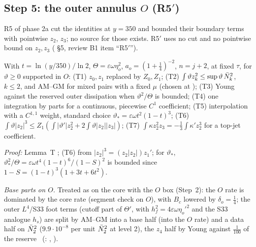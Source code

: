 \documentclass[11pt]{article}
\begin{document}
\subsection{Step 5: the outer annulus $O$ (R5$'$)}\label{A:sec:outer}
R5 of phase 2a cut the identities at $y=350$ and bounded their boundary terms with pointwise $z_2$, $z_3$; no source for those exists. R5$'$ uses no cut and no pointwise bound on $z_2,z_3$ ( \S5, review B1 item ``R5$'$'').
\begin{lemma}\label{A:lem:tools}
With $t=\ln(y/350)/\ln2$, $\Theta=\varepsilon\omega\eta_o^2$, $a_o=(1+\frac14)^{-2}$, $n=j+2$, at fixed $\tau$, for $\vartheta\ge0$ supported in $O$: (T1) $z_0,z_1$ replaced by $Z_0,Z_1$; (T2) $\int\vartheta z_k^2\le\sup\vartheta\,\bar N_k^2$, $k\le2$, and AM--GM for mixed pairs with a fixed $\mu$ (chosen at ); (T3) Young against the reserved outer dissipation when $\vartheta^2/\Theta$ is bounded; (T4) one integration by parts for a continuous, piecewise $C^1$ coefficient; (T5) interpolation with a $C^{1,1}$ weight, standard choice $\vartheta_*=\varepsilon\omega t^2(1-t)^3$; (T6) $\int\vartheta|z_2|^3\le Z_1(\int|\vartheta'|z_2^2+2\int\vartheta|z_2||z_3|)$; (T7) $\int\kappa z_2^2z_3=-\frac13\int\kappa'z_2^3$ for a top-jet coefficient.
\end{lemma}
\noindent\emph{Proof:}  Lemma~T \tP; (T6) from $|z_2|^3=(z_2|z_2|)z_1'$; for $\vartheta_*$, $\vartheta_*^2/\Theta=\varepsilon\omega t^4(1-t)^6/(1-S)^2$ is bounded since $1-S=(1-t)^3(1+3t+6t^2)$.

\emph{Base parts on $O$.} Treated as on the core with the $O$ box (Step~2): the $O$ rate is dominated by the core rate (segment check on $O$), with $B_c$ lowered by $\delta_o=\frac14$; the outer $L^4$/S33 foot terms (cutoff part of $\Theta'$, with $h_f^2=4\varepsilon\omega\eta_o'^2$ and the S33 analogue $h_s$) are split by AM--GM into a base half (into the $O$ rate) and a data half on $\bar N_2^2$ ($9.9\cdot10^{-8}$ per unit $\bar N_2^2$ at level 2), the $z_4$ half by Young against $\frac1{100}$ of the reserve \tC\ (: , ).
\end{document}
